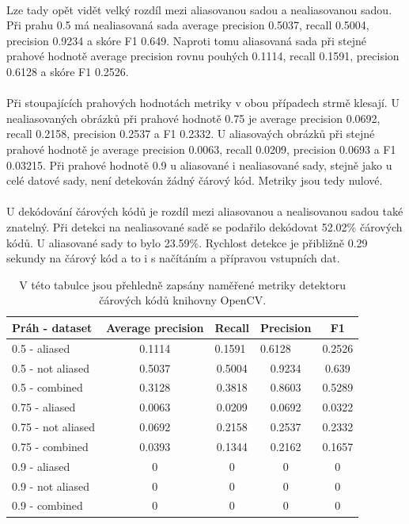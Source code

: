 \paragraph{} Lze tady opět vidět velký rozdíl mezi aliasovanou sadou a nealiasovanou sadou. Při prahu 0.5 má nealiasovaná sada average precision 0.5037, recall 0.5004, precision 0.9234 a skóre F1 0.649. Naproti tomu aliasovaná sada při stejné prahové hodnotě average precision rovnu pouhých 0.1114, recall 0.1591, precision 0.6128 a skóre F1 0.2526. 
\paragraph{} Při stoupajících prahových hodnotách metriky v obou případech strmě klesají. U nealiasovaných obrázků při prahové hodnotě 0.75 je average precision 0.0692, recall 0.2158, precision 0.2537 a F1 0.2332. U aliasovaých obrázků při stejné prahové hodnotě je average precision 0.0063, recall 0.0209, precision 0.0693 a F1 0.03215. Při prahové hodnotě 0.9 u aliasované i nealiasované sady, stejně jako u celé datové sady, není detekován žádný čárový kód. Metriky jsou tedy nulové.
\paragraph{} U dekódování čárových kódů je rozdíl mezi aliasovanou a nealisovanou sadou také znatelný. Při detekci na nealiasované sadě se podařilo dekódovat 52.02\% čárových kódů. U aliasované sady to bylo 23.59\%. Rychlost detekce je přibližně 0.29 sekundy na čárový kód a to i s načítáním a přípravou vstupních dat.

\begin{table}[ht]
\centering
\begin{tabular}{|l|c|c|c|c|}
\hline
Práh - dataset     & Average precision & Recall  & Precision & F1      \\ \hline
0.5 - aliased & 0.1114 & \multicolumn{1}{l|}{0.1591} & \multicolumn{1}{l|}{0.6128} & \multicolumn{1}{l|}{0.2526} \\ \hline
0.5 - not aliased  & 0.5037           & 0.5004 & 0.9234   & 0.639 \\ \hline
0.5 - combined     & 0.3128           & 0.3818 & 0.8603    & 0.5289 \\ \hline
0.75 - aliased     & 0.0063             & 0.0209  & 0.0692    & 0.0322  \\ \hline
0.75 - not aliased & 0.0692            & 0.2158 & 0.2537   & 0.2332 \\ \hline
0.75 - combined    & 0.0393            & 0.1344 & 0.2162   & 0.1657  \\ \hline
0.9 - aliased      & 0               & 0     & 0       & 0     \\ \hline
0.9 - not aliased  & 0               & 0     & 0       & 0     \\ \hline
0.9 - combined     & 0               & 0     & 0       & 0     \\ \hline
\end{tabular}
\caption{V této tabulce jsou přehledně zapsány naměřené metriky detektoru čárových kódů knihovny OpenCV.}
\label{opencv_table}
\end{table}


